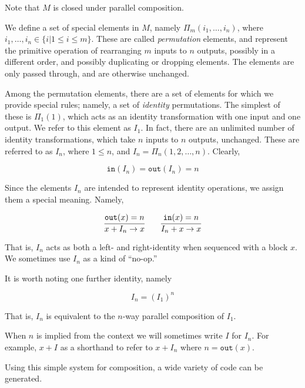 Note that $M$ is closed under parallel composition.

We define a set of special elements in $M$, namely $\Pi_m(i_1,\ldots,i_n)$,
where $i_1,\ldots,i_n \in \lbrace i | 1 \leq i \leq m \rbrace$. These are
called \emph{permutation} elements, and represent the primitive operation of
rearranging $m$ inputs to $n$ outputs, possibly in a different order, and
possibly duplicating or dropping elements. The elements are only passed
through, and are otherwise unchanged.

Among the permutation elements, there are a set of elements for which we
provide special rules; namely, a set of \emph{identity} permutations. The
simplest of these is $\Pi_1(1)$, which acts as an identity transformation with
one input and one output. We refer to this element as $I_1$. In fact, there
are an unlimited number of identity transformations, which take $n$ inputs to
$n$ outputs, unchanged. These are referred to as $I_n$, where $1 \leq n$, and
$I_n = \Pi_n(1,2,\ldots,n)$. Clearly,

\[
\mathtt{in}(I_n) = \mathtt{out}(I_n) = n
\]

Since the elements $I_n$ are intended to represent identity operations, we
assign them a special meaning. Namely,

\[
\infer{x + I_n \to x}{\mathtt{out}(x) = n} 
\qquad
\infer{I_n + x \to x}{\mathtt{in}(x) = n}
\]

That is, $I_n$ acts as both a left- and right-identity when sequenced with a
block $x$. We sometimes use $I_n$ as a kind of ``no-op.''

It is worth noting one further identity, namely

\[
I_n = (I_1)^n
\]

That is, $I_n$ is equivalent to the $n$-way parallel composition of $I_1$.

When $n$ is implied from the context we will sometimes write $I$ for $I_n$.
For example, $x+I$ as a shorthand to refer to $x+I_n$ where $n =
\mathtt{out}(x)$.

Using this simple system for composition, a wide variety of code can be
generated.
